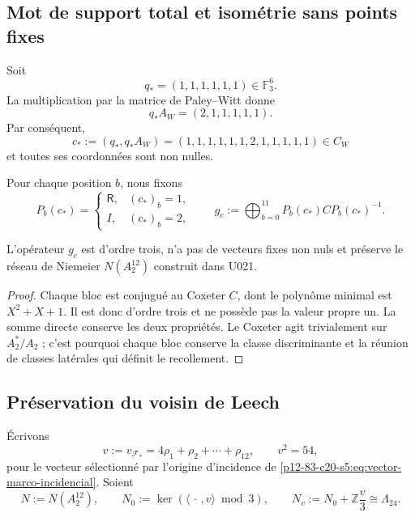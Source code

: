 \subsection{Mot de support total et isométrie sans points fixes}

Soit
\[
 q_*=(1,1,1,1,1,1)\in\mathbb F_3^6.
\]
La multiplication par la matrice de Paley--Witt donne
\begin{equation}
 q_*A_W=(2,1,1,1,1,1).
 \label{p12-83-c20-s8:eq:producto-qstar-aw-u031}
\end{equation}
Par conséquent,
\begin{equation}
 c_*:=(q_*,q_*A_W)
 =(1,1,1,1,1,1,2,1,1,1,1,1)
 \in C_W
 \label{p12-83-c20-s8:eq:palabra-soporte-total-u031}
\end{equation}
et toutes ses coordonnées sont non nulles.

Pour chaque position \(b\), nous fixons
\begin{equation}
 P_b(c_*)=
 \begin{cases}
  \mathsf R,&(c_*)_b=1,\\
  I,&(c_*)_b=2,
 \end{cases}
 \qquad
 g_c:=\bigoplus_{b=0}^{11}P_b(c_*)CP_b(c_*)^{-1}.
 \label{p12-83-c20-s8:eq:isometria-orden-tres-u031}
\end{equation}

\begin{proposition}
\label{p12-83-c20-s8:prop:isometria-fijo-libre-pegado-u031}
L'opérateur \(g_c\) est d'ordre trois, n'a pas de vecteurs fixes non nuls et
préserve le réseau de Niemeier \(N(A_2^{12})\) construit dans U021.
\end{proposition}

\begin{proof}
Chaque bloc est conjugué au Coxeter \(C\), dont le polynôme minimal est
\(X^2+X+1\). Il est donc d'ordre trois et ne possède pas la valeur propre un. La somme
directe conserve les deux propriétés. Le Coxeter agit trivialement sur
\(A_2^*/A_2\) ; c'est pourquoi chaque bloc conserve la classe discriminante et la
réunion de classes latérales qui définit le recollement.
\end{proof}

\subsection{Préservation du voisin de Leech}

Écrivons
\[
 v:=v_{\mathcal F_*}
 =4\rho_1+\rho_2+\cdots+\rho_{12},
 \qquad
 v^2=54,
\]
pour le vecteur sélectionné par l'origine d'incidence de
\eqref{p12-83-c20-s5:eq:vector-marco-incidencial}. Soient
\[
 N:=N(A_2^{12}),
 \qquad
 N_0:=\ker(\langle\,\cdot\,,v\rangle\bmod3),
 \qquad
 N_v:=N_0+\mathbb Z\frac v3\cong\Lambda_{24}.
\]

